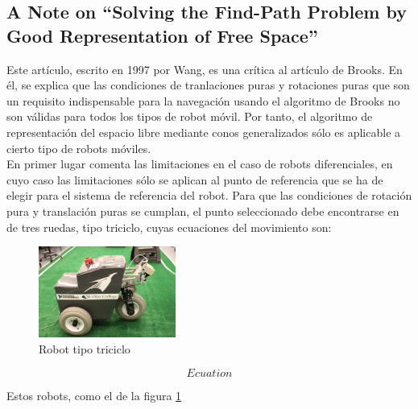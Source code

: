 \subsection{A Note on ``Solving the Find-Path Problem by Good Representation of Free Space''}

Este artículo, escrito en 1997 por Wang, es una crítica al artículo de Brooks. En él, se explica que las condiciones de tranlaciones puras y rotaciones puras que son un requisito indispensable para la navegación usando el algoritmo de Brooks no son válidas para todos los tipos de robot móvil. Por tanto, el algoritmo de representación del espacio libre mediante conos generalizados sólo es aplicable a cierto tipo de robots móviles.\\

En primer lugar comenta las limitaciones en el caso de robots diferenciales, en cuyo caso las limitaciones sólo se aplican al punto de referencia que se ha de elegir para el sistema de referencia del robot. Para que las condiciones de rotación pura y translación puras se cumplan, el punto seleccionado debe encontrarse en \\


 de tres ruedas, tipo triciclo, cuyas ecuaciones del movimiento son:

\begin{figure}[h]
		\centering
        \includegraphics[width=0.4\textwidth]{images/triciclo.jpg}
        \caption{Robot tipo triciclo}
        \label{fig:triciclo}
\end{figure} 

\[Ecuation\]

Estos robots, como el de la figura \ref{fig:triciclo}
\newpage

